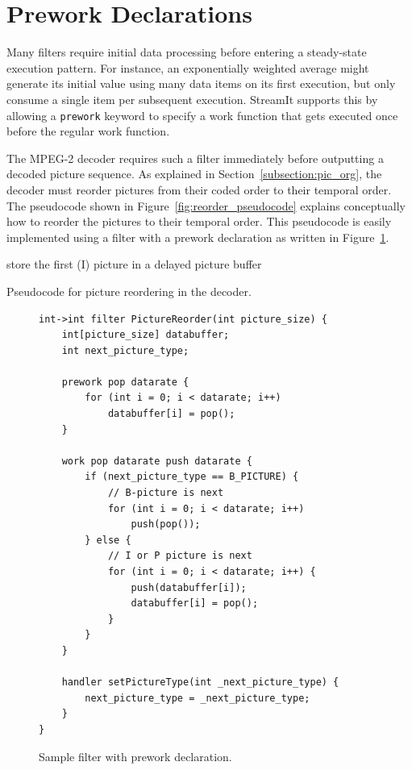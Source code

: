 \section{Prework Declarations}

Many filters require initial data processing before entering a 
steady-state execution pattern.
For instance, an exponentially weighted average might generate 
its initial value using many data items on its first execution, 
but only consume a single item per subsequent execution. 
StreamIt supports this by allowing a {\tt prework} keyword to 
specify a work function that gets executed once before the 
regular work function. 

The MPEG-2 decoder requires such a filter immediately before outputting a decoded
picture sequence. As explained in Section~\ref{subsection:pic_org}, the decoder 
must reorder pictures from their coded order to their temporal order. 
The pseudocode shown in Figure~\ref{fig:reorder_pseudocode} 
explains conceptually how to reorder
the pictures to their temporal order. 
This pseudocode is easily implemented using a filter with a prework declaration as 
written in Figure~\ref{fig:picture_reorder}.

\begin{algorithm}
\SetLine
store the first (I) picture in a delayed picture buffer\;
\caption{Pseudocode for picture reordering in the decoder.}
\label{fig:reorder_pseudocode}
\end{algorithm}

\begin{figure}
  \begin{center}
    \begin{minipage}{4.5in}
      \begin{small}
        \begin{verbatim}
int->int filter PictureReorder(int picture_size) {
    int[picture_size] databuffer;
    int next_picture_type;

    prework pop datarate {
        for (int i = 0; i < datarate; i++)
            databuffer[i] = pop();
    }

    work pop datarate push datarate {
        if (next_picture_type == B_PICTURE) { 
            // B-picture is next
            for (int i = 0; i < datarate; i++)
                push(pop());
        } else {
            // I or P picture is next
            for (int i = 0; i < datarate; i++) {
                push(databuffer[i]);
                databuffer[i] = pop();
            }
        }     
    }

    handler setPictureType(int _next_picture_type) {
        next_picture_type = _next_picture_type;
    }
}
        \end{verbatim}
      \end{small}
    \end{minipage}
  \end{center}
  \caption{Sample filter with prework declaration.}
  \label{fig:picture_reorder}
\end{figure}

